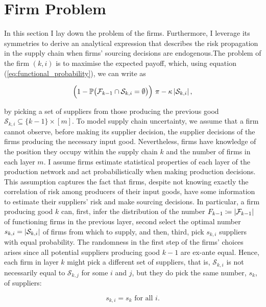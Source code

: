 \documentclass[../../main.tex]{subfiles}
\begin{document}
\section{Firm Problem}

In this section I lay down the problem of the firms. Furthermore, I leverage its symmetries to derive an analytical expression that describes the risk propagation in the supply chain when firms' sourcing decisions are endogenous.The problem of the firm $(k, i)$ is to maximise the expected payoff, which, using equation (\ref{eq:functional_probability}), we can write as

\begin{equation}
  \Big(1 - \mathbb{P}\big( \mathcal{F}_{k - 1} \cap \mathcal{S}_{k, i} = \emptyset \big) \Big) \ \pi  - \kappa \left\lvert\mathcal{S}_{k, i} \right\rvert,
\end{equation}

by picking a set of suppliers from those producing the previous good $\mathcal{S}_{k, i} \subseteq \{k - 1\} \times [m]$. To model supply chain uncertainty, we assume that a firm cannot observe, before making its supplier decision, the supplier decisions of the firms producing the necessary input good. Nevertheless, firms have knowledge of the position they occupy within the supply chain $k$ and the number of firms in each layer $m$. I assume firms estimate statistical properties of each layer of the production network and act probabilistically when making production decisions. This assumption captures the fact that firms, despite not knowing exactly the correlation of risk among producers of their input goods, have some information to estimate their suppliers' risk and make sourcing decisions. In particular, a firm producing good $k$ can, first, infer the distribution of the number $F_{k - 1} \coloneqq \left\lvert\mathcal{F}_{k - 1}\right\rvert$ of functioning firms in the previous layer, second select the optimal number $s_{k, i} = \left\lvert\mathcal{S}_{k, i}\right\rvert$ of firms from which to supply, and then, third, pick $s_{k, i}$ suppliers with equal probability. The randomness in the first step of the firms' choices arises since all potential suppliers producing good $k - 1$ are ex-ante equal. Hence, each firm in layer $k$ might pick a different set of suppliers, that is, $\mathcal{S}_{k, i}$ is not necessarily equal to $\mathcal{S}_{k, j}$ for some $i$ and $j$, but they do pick the same number, $s_k$, of suppliers:

\begin{equation}
  s_{k, i} = s_k \text{ for all } i.
\end{equation}
\end{document}
